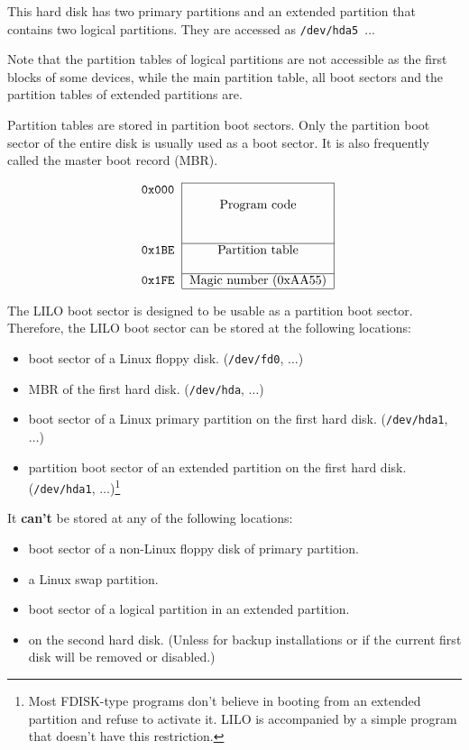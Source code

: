 This hard disk has two primary partitions and an extended partition
that contains two logical partitions. They are accessed as
{\tt /dev/hda5 $\ldots$}

Note that the partition tables of logical partitions are not accessible
as the first blocks of some devices, while the main partition table,
all boot sectors and the partition tables of extended partitions are.

Partition tables are stored in partition boot sectors. Only the partition
boot sector of the entire disk is usually used as a boot sector. It is
also frequently called the master boot record (MBR).

$$
\begin{tabular}{r|c|}
  \cline{2-2}
  \tt 0x000 & \\
  & Program code \\
  & \\
  & \\
  \cline{2-2}
  \tt 0x1BE & Partition table \\
  & \\
  \cline{2-2}
  \tt 0x1FE & Magic number (0xAA55) \\
  \cline{2-2}
\end{tabular}
$$

The LILO boot sector is designed to be usable as a partition boot sector.
Therefore, the LILO boot sector can be stored at the following locations:

\begin{itemize}
  \item boot sector of a Linux floppy disk. ({\tt /dev/fd0}, $\ldots$)
  \item MBR of the first hard disk. ({\tt /dev/hda}, $\ldots$)
  \item boot sector of a Linux primary partition on the first hard
    disk. ({\tt /dev/hda1}, $\ldots$)
  \item partition boot sector of an extended partition on the first hard disk.
    ({\tt /dev/hda1}, $\ldots$)\footnote{Most FDISK-type programs don't
      believe in booting from an extended partition and refuse to
      activate it. LILO is accompanied by a simple program that doesn't
      have this restriction.}
\end{itemize}

It {\bf can't} be stored at any of the following locations:

\begin{itemize}
  \item boot sector of a non-Linux floppy disk of primary partition.
  \item a Linux swap partition.
  \item boot sector of a logical partition in an extended partition.
  \item on the second hard disk. (Unless for backup installations or
    if the current first disk will be removed or disabled.)
\end{itemize}


